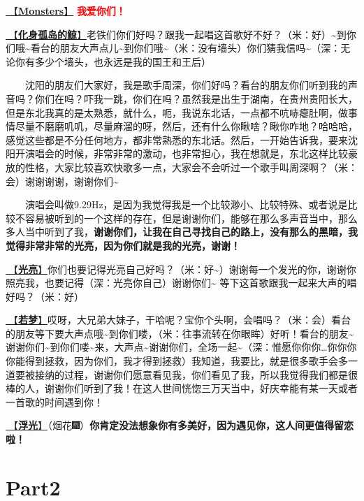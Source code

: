 \documentclass[]{ctexbook}
\begin{document}
\hyperref[Monsters]{🎵【\textbf{Monsters}】} \textbf{\textcolor{red}{我爱你们！}}

\hyperref[hua-shen-gu-dao-de-jing]{🎵【\textbf{化身孤岛的鲸}】}老铁们你们好吗？跟我一起唱这首歌好不好？（米：好）\textasciitilde 到你们哦\textasciitilde 看台的朋友大声点儿\textasciitilde 到你们哦\textasciitilde（米：没有墙头）你们猜我信吗\textasciitilde（深：无论你有多少个墙头，也永远是我的国王和王后）

  沈阳的朋友们大家好，我是歌手周深，你们好吗？看台的朋友你们听到我的声音吗？你们在吗？吓我一跳，你们在吗？虽然我是出生于湖南，在贵州贵阳长大，但是东北我真的是太熟悉，就什么，呃，我说东北话，一点都不吭哧瘪肚啊，做事情尽量不磨磨叽叽，尽量麻溜的呀，然后，还有什么你瞅啥？瞅你咋地？哈哈哈，感觉这些都是不分任何地方，都非常熟悉的东北话。然后，一开始告诉我，要来沈阳开演唱会的时候，非常非常的激动，也非常担心，我在想就是，东北这样比较豪放的性格，大家比较喜欢快歌多一点，大家会不会听过一个歌手叫周深啊？（米：会）谢谢谢谢，谢谢你们\textasciitilde{}

  演唱会叫做9.29Hz，是因为我觉得我是一个比较渺小、比较特殊、或者说是比较不容易被听到的一个这样的存在，但是谢谢你们，能够在那么多声音当中，那么多人当中听到了我，\textbf{谢谢你们，让我在自己寻找自己的路上，没有那么的黑暗，我觉得非常非常的光亮，因为你们就是我的光亮，谢谢！}

\hyperref[silver-linings]{🎵【\textbf{光亮}】}你们也要记得光亮自己好吗？（米：好\textasciitilde）谢谢每一个发光的你，谢谢你照亮我，也要记得（深：光亮你自己）谢谢你们\textasciitilde{}
等下这首歌跟我一起来大声的唱好吗？（米：好）

\hyperref[ruomeng]{🎵【\textbf{若梦}】}哎呀，大兄弟大妹子，干哈呢？宝你个头啊，会唱吗？（米：会）看台的朋友等下要大声点哦\textasciitilde 到你们喽，（米：往事流转在你眼眸）好听！看台的朋友\textasciitilde 谢谢你们\textasciitilde 到你们喽\textasciitilde 来，大声点\textasciitilde 谢谢你们，全场一起\textasciitilde（深：惟愿你你你\ldots 你你你你能得到拯救，因为你们，我才得到拯救）我知道，我要比，就是很多歌手会多一道要被接纳的过程，谢谢你们愿意看见我，你们看见了我，所以我觉得我们都是很棒的人，谢谢你们听到了我！在这人世间恍惚三万天当中，好庆幸能有某一天或者一首歌的时间遇到你！

\hyperref[floating-light]{🎵【\textbf{浮光}】}（烟花🎆）\textbf{你肯定没法想象你有多美好，因为遇见你，这人间更值得留恋啦！}

\section{Part2}\label{shenyang-20240907-part2}
\end{document}
